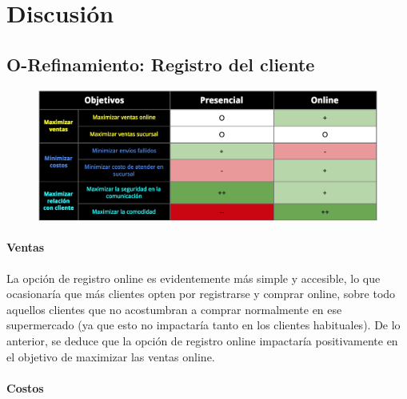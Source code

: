 \section{Discusión}


\subsection{O-Refinamiento: Registro del cliente}
\begin{figure}[ht]
  \includegraphics[width=\linewidth]{tp1/images/objetivo-blando-registro-cliente.png}
\end{figure}

\paragraph{Ventas}

La opción de registro online es evidentemente más simple y accesible, lo que
ocasionaría que más clientes opten por registrarse y comprar online, sobre
todo aquellos clientes que no acostumbran a comprar normalmente en ese
supermercado (ya que esto no impactaría tanto en los clientes habituales). De
lo anterior, se deduce que la opción de registro online impactaría
positivamente en el objetivo de maximizar las ventas online.

\paragraph{Costos}

